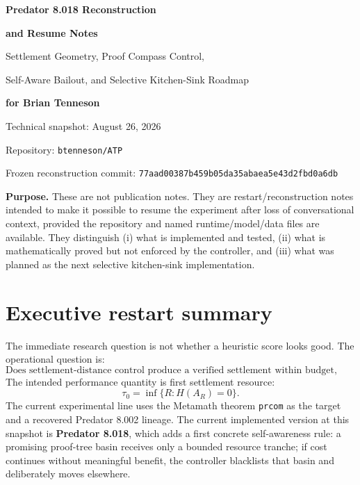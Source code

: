 \documentclass[11pt]{article}
\newcommand{\code}[1]{\texttt{#1}}
\begin{document}
\begin{titlepage}
\centering
\vspace*{0.65in}
{\Huge\bfseries\color{navy} Predator 8.018 Reconstruction\par}
\vspace{0.15in}
{\Huge\bfseries\color{navy} and Resume Notes\par}
\vspace{0.35in}
{\Large Settlement Geometry, Proof Compass Control,\par}
{\Large Self-Aware Bailout, and Selective Kitchen-Sink Roadmap\par}
\vspace{0.6in}
{\LARGE\bfseries for Brian Tenneson\par}
\vspace{0.35in}
{\large Technical snapshot: August 26, 2026\par}
\vspace{0.12in}
{\large Repository: \code{btenneson/ATP}\par}
{\large Frozen reconstruction commit: \code{77aad00387b459b05da35abaea5e43d2fbd0a6db}\par}
\vfill
\begin{minipage}{0.88\textwidth}
\small
\textbf{Purpose.} These are not publication notes. They are restart/reconstruction notes intended to make it possible to resume the experiment after loss of conversational context, provided the repository and named runtime/model/data files are available. They distinguish (i) what is implemented and tested, (ii) what is mathematically proved but not enforced by the controller, and (iii) what was planned as the next selective kitchen-sink implementation.
\end{minipage}
\vfill
\end{titlepage}

\tableofcontents
\newpage

\section{Executive restart summary}

The immediate research question is not whether a heuristic score looks good. The operational question is:
\[
\boxed{\text{Does settlement-distance control produce a verified settlement within budget, and how quickly?}}
\]
The intended performance quantity is first settlement resource:
\[
\tau_0=\inf\{R:H(A_R)=0\}.
\]
The current experimental line uses the Metamath theorem \code{prcom} as the target and a recovered Predator 8.002 lineage. The current implemented version at this snapshot is \textbf{Predator 8.018}, which adds a first concrete self-awareness rule: a promising proof-tree basin receives only a bounded resource tranche; if cost continues without meaningful benefit, the controller blacklists that basin and deliberately moves elsewhere.
\end{document}
